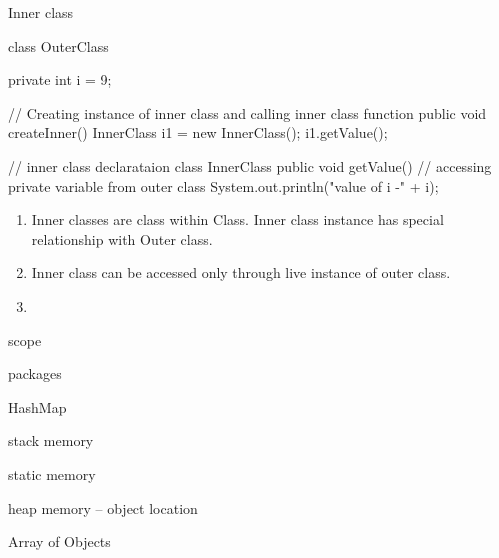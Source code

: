 \documentclass[11pt]{beamer}
\begin{document}
\begin{frame}{Inner class}

\begin{java}
class OuterClass {
private int i = 9;
 
// Creating instance of inner class and calling inner class function
public void createInner() {
InnerClass i1 = new InnerClass();
i1.getValue();
}
 
// inner class declarataion
class InnerClass {
public void getValue() {
// accessing private variable from outer class
System.out.println("value of i -" + i);
}
}
}


\end{java}

\begin{enumerate}
\item Inner classes are class within Class. Inner class instance has special relationship with Outer class.
\item Inner class can be accessed only through live instance of outer class.
\item 
\end{enumerate}



\end{frame}


\begin{frame}{scope}

\end{frame}


\begin{frame}{packages}

\end{frame}


\begin{frame}{HashMap}

\end{frame}


\begin{frame}{stack memory}

\end{frame}


\begin{frame}{static memory}

\end{frame}


\begin{frame}{heap memory -- object location}

\end{frame}


\begin{frame}{Array of Objects}

\end{frame}
\end{document}
